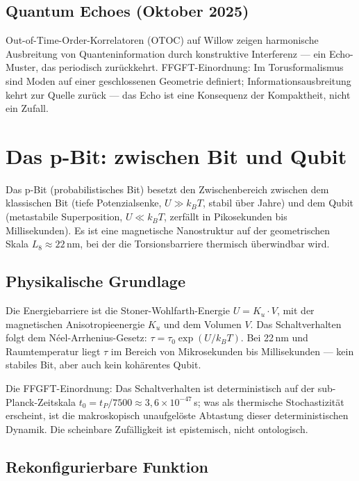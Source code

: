 \subsection*{Quantum Echoes (Oktober 2025)}

Out-of-Time-Order-Korrelatoren (OTOC) auf Willow zeigen harmonische
Ausbreitung von Quanteninformation durch konstruktive Interferenz --- ein
Echo-Muster, das periodisch zurückkehrt. FFGFT-Einordnung: Im
Torusformalismus sind Moden auf einer geschlossenen Geometrie
definiert; Informationsausbreitung kehrt zur Quelle zurück --- das Echo
ist eine Konsequenz der Kompaktheit, nicht ein Zufall.

\section{Das p-Bit: zwischen Bit und Qubit}

Das p-Bit (probabilistisches Bit) besetzt den Zwischenbereich zwischen
dem klassischen Bit (tiefe Potenzialsenke, $U\gg k_BT$, stabil über
Jahre) und dem Qubit (metastabile Superposition, $U\ll k_BT$, zerfällt in
Pikosekunden bis Millisekunden). Es ist eine magnetische Nanostruktur auf
der geometrischen Skala $L_8\approx22$\,nm, bei der die Torsionsbarriere
thermisch überwindbar wird.

\subsection*{Physikalische Grundlage}

Die Energiebarriere ist die Stoner-Wohlfarth-Energie $U = K_u\cdot V$,
mit der magnetischen Anisotropieenergie $K_u$ und dem Volumen $V$. Das
Schaltverhalten folgt dem Néel-Arrhenius-Gesetz:
$\tau = \tau_0\exp(U/k_BT)$. Bei 22\,nm und Raumtemperatur liegt $\tau$
im Bereich von Mikrosekunden bis Millisekunden --- kein stabiles Bit,
aber auch kein kohärentes Qubit.

Die FFGFT-Einordnung: Das Schaltverhalten ist deterministisch auf der
sub-Planck-Zeitskala $t_0 = t_P/7500\approx3{,}6\times10^{-47}$\,s;
was als thermische Stochastizität erscheint, ist die makroskopisch
unaufgelöste Abtastung dieser deterministischen Dynamik. Die scheinbare
Zufälligkeit ist epistemisch, nicht ontologisch.

\subsection*{Rekonfigurierbare Funktion}

